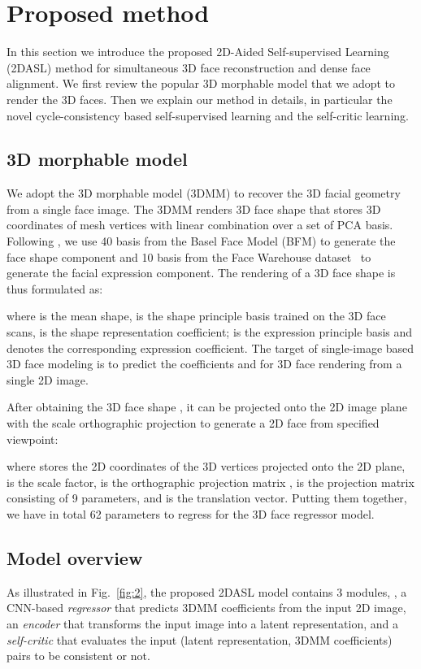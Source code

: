 \documentclass[10pt,twocolumn,letterpaper]{article}
\begin{document}
\section{Proposed method}
In this section we introduce the proposed 2D-Aided Self-supervised Learning (2DASL) method for simultaneous 3D face reconstruction and dense face alignment. We first review the popular 3D morphable model that we adopt to render the 3D faces. Then we explain our method in details, in particular the novel cycle-consistency based  self-supervised learning and the  {self-critic learning}.

\subsection{3D morphable model}
We adopt the 3D morphable model (3DMM) \cite{blanz1999morphable} to recover the 3D facial geometry from a single face image.
The 3DMM renders  3D face {shape}  that stores 3D coordinates of  mesh vertices  with {linear combination over} a set of PCA basis. {Following \cite{zhu2016face}}, we use 40  {basis} from the Basel Face Model (BFM) \cite{paysan20093d} to generate the  {face shape} component  and 10 {basis} from the Face Warehouse dataset~\cite{cao2014facewarehouse} to generate the facial expression component. The rendering of a 3D face shape is thus formulated as:

where  is the mean shape,  is the shape principle basis {trained on the 3D face scans},  is the shape representation coefficient;  is the expression principle basis and  denotes the corresponding expression coefficient. The target of single-image based 3D face modeling is to predict the coefficients  and  for 3D face rendering from a single 2D image.

After obtaining the  3D face shape ,  it can be projected onto the 2D image plane with the scale orthographic projection to generate a 2D face from specified viewpoint:

where  stores the 2D coordinates of the  3D vertices projected  onto the 2D plane,  is the scale factor,  is the orthographic projection matrix ,  is the projection matrix consisting of 9 parameters, and  is the translation vector. Putting them together, we have in total 62 parameters  to regress for the 3D face regressor model.

\subsection{Model overview}
As illustrated in Fig.~\ref{fig:2}, the proposed 2DASL model contains 3  modules, \ie, a CNN-based  \emph{regressor} that predicts  3DMM coefficients from the input 2D image, an \emph{encoder} that transforms the input image into a  {latent representation}, and a \emph{self-critic} that evaluates   the input (latent representation,  3DMM coefficients) pairs to be  consistent  or  not. 
\end{document}
